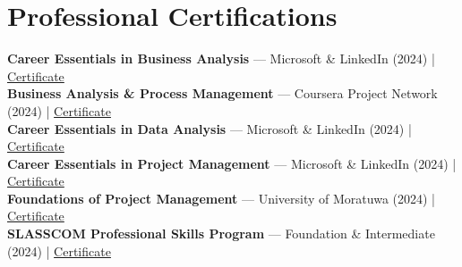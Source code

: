 \documentclass[letterpaper,10pt]{article}
\newenvironment{resume_list}{
  \vspace{-2pt}
  \begin{itemize}[itemsep=1pt, leftmargin=14pt]
}{
  \end{itemize}\vspace{-3pt}
}
\begin{document}

\section{Professional Certifications}
\vspace{-1pt}

\textbf{Career Essentials in Business Analysis} — Microsoft \& LinkedIn (2024) | \href{https://www.linkedin.com/posts/vindya-kodithuwakku-bb6187202_businessanalysis-careeressentials-microsoft-activity-7371193871919398914-PKak}{Certificate}\\
\textbf{Business Analysis \& Process Management} — Coursera Project Network (2024) | \href{https://coursera.org/verify/D5WHDN27811C}{Certificate}\\
\textbf{Career Essentials in Data Analysis} — Microsoft \& LinkedIn (2024) | \href{https://www.linkedin.com/posts/vindya-kodithuwakku-bb6187202_dataanalysis-careeressentials-microsoft-activity-7379124237950750720-kKmD}{Certificate}\\
\textbf{Career Essentials in Project Management} — Microsoft \& LinkedIn (2024) | \href{https://www.linkedin.com/posts/vindya-kodithuwakku-bb6187202_projectmanagement-careeressentials-microsoft-activity-7374470702059438080-zbfj}{Certificate}\\
\textbf{Foundations of Project Management} — University of Moratuwa (2024) | \href{https://open.uom.lk/lms/mod/customcert/verify_certificate.php?code=ATuxOYBBAE&qrcode=1}{Certificate}\\
\textbf{SLASSCOM Professional Skills Program} — Foundation \& Intermediate (2024) | \href{https://www.linkedin.com/posts/vindya-kodithuwakku-bb6187202_slasscom-professionalskillsprogram-careerdevelopment-activity-7379038487246860288-PRA0}{Certificate}


\end{document}
\end{resume_list}
\end{document}
